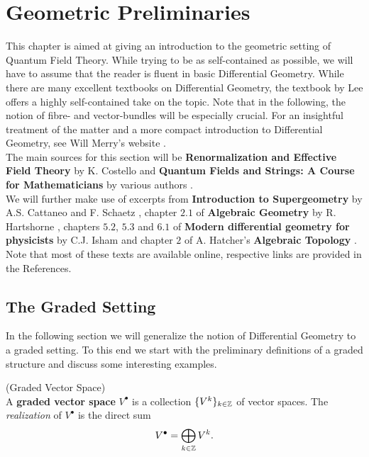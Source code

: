 \section{Geometric Preliminaries}
\label{sec:Geometric_Preliminaries}

This chapter is aimed at giving an introduction to the geometric setting of Quantum Field Theory. While trying to be as self-contained as possible, we will have to assume that the reader is fluent in basic Differential Geometry. While there are many excellent textbooks on Differential Geometry, the textbook by Lee  offers a highly self-contained take on the topic. Note that in the following, the notion of fibre- and vector-bundles will be especially crucial. For an insightful treatment of the matter and a more compact introduction to Differential Geometry, see Will Merry's website .\\

The main sources for this section will be \textbf{Renormalization and Effective Field Theory} by K. Costello  and \textbf{Quantum Fields and Strings:  A Course for Mathematicians} by various authors .\\

We will further make use of excerpts from \textbf{Introduction to Supergeometry} by A.S. Cattaneo and F. Schaetz , chapter $2.1$ of \textbf{Algebraic Geometry} by R. Hartshorne , chapters $5.2$, $5.3$ and $6.1$ of \textbf{Modern differential geometry for physicists} by C.J. Isham  and chapter $2$ of A. Hatcher's \textbf{Algebraic Topology} . Note that most of these texts are available online, respective links are provided in the References.

\subsection{The Graded Setting}

In the following section we will generalize the notion of Differential Geometry to a graded setting. To this end we start with the preliminary definitions of a graded structure and discuss some interesting examples.

\begin{definition} (Graded Vector Space)\\
  A \textbf{graded vector space} $V^\bullet$ is a collection $\{ V^k \}_{k\in\mathbb{Z}}$ of vector spaces. The \textit{realization} of $V^\bullet$ is the direct sum
  $$ V^\bullet = \bigoplus_{k\in\mathbb{Z}} V^k .$$
\end{definition}

